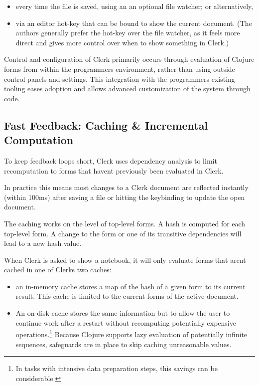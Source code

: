 \documentclass[sigconf,screen,pbalance=true]{acmart}
\providecommand{\tightlist}{%
  \setlength{\itemsep}{0pt}\setlength{\parskip}{0pt}}
\begin{document}
\begin{itemize}
\tightlist
\item
  every time the file is saved, using an an optional file watcher; or alternatively,
\item
  via an editor hot-key that can be bound to show the current document. (The authors generally prefer the hot-key over the file watcher, as it feels more direct and gives more control over when to show something in Clerk.)
\end{itemize}

Control and configuration of Clerk primarily occurs through evaluation of Clojure forms from within the programmer\textquotesingle s environment, rather than using outside control panels and settings. This integration with the programmer\textquotesingle s existing tooling eases adoption and allows advanced customization of the system through code.

\hypertarget{fast-feedback:-caching-ux5cux26-incremental-computation}{%
\subsection{Fast Feedback: Caching \& Incremental Computation}\label{fast-feedback:-caching-ux5cux26-incremental-computation}}

To keep feedback loops short, Clerk uses dependency analysis to limit recomputation to forms that haven\textquotesingle t previously been evaluated in Clerk.

In practice this means most changes to a Clerk document are reflected instantly (within 100ms) after saving a file or hitting the keybinding to update the open document.

The caching works on the level of top-level forms. A hash is computed for each top-level form. A change to the form or one of its transitive dependencies will lead to a new hash value.

When Clerk is asked to show a notebook, it will only evaluate forms that aren\textquotesingle t cached in one of Clerk\textquotesingle s two caches:

\begin{itemize}
\tightlist
\item
  an in-memory cache stores a map of the hash of a given form to its current result. This cache is limited to the current forms of the active document.
\item
  An on-disk-cache stores the same information but to allow the user to continue work after a restart without recomputing potentially expensive operations.\footnote{In tasks with intensive data preparation steps, this savings can be considerable.} Because Clojure supports lazy evaluation of potentially infinite sequences, safeguards are in place to skip caching unreasonable values.
\end{itemize}
\end{document}
